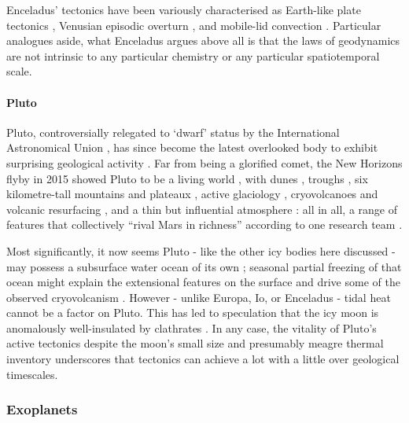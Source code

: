 \documentclass[a4paper,11pt,oneside]{book}
\begin{document}
Enceladus' tectonics have been variously characterised as Earth-like plate tectonics \cite{Kargel1983-hd}, Venusian episodic overturn \citet{Tobie2008-mf, ONeill2010-bu}, and mobile-lid convection \cite{Barr2008-ro}. Particular analogues aside, what Enceladus argues above all is that the laws of geodynamics are not intrinsic to any particular chemistry or any particular spatiotemporal scale.

\paragraph{Pluto}

Pluto, controversially relegated to `dwarf' status by the International Astronomical Union \cite{Marschall2009-pd}, has since become the latest overlooked body to exhibit surprising geological activity \cite{Hand2015-bv}. Far from being a glorified comet, the New Horizons flyby in 2015 \cite{Stern2015-fe} showed Pluto to be a living world \cite{Moore2016-jb}, with dunes \cite{Telfer2018-sy}, troughs \cite{Grundy2016-ya}, six kilometre-tall mountains and plateaux \cite{Schenk2018-jv}, active glaciology \cite{Bertrand2016-qq}, cryovolcanoes \cite{Singer2018-eh} and volcanic resurfacing \citet{Singer2017-dn, Cruikshank2019-al, Dalle_Ore2019-ke}, and a thin but influential atmosphere \cite{Gladstone2016-hn}: all in all, a range of features that collectively ``rival Mars in richness'' according to one research team \cite{Stern2018-ui}.

Most significantly, it now seems Pluto - like the other icy bodies here discussed - may possess a subsurface water ocean of its own \cite{Nimmo2016-fj}; seasonal partial freezing of that ocean might explain the extensional features on the surface \cite{Hammond2016-ha} and drive some of the observed cryovolcanism \cite{Dalle_Ore2019-ke}. However - unlike Europa, Io, or Enceladus - tidal heat cannot be a factor on Pluto. This has led to speculation that the icy moon is anomalously well-insulated by clathrates \cite{Kamata2019-yv}. In any case, the vitality of Pluto's active tectonics despite the moon's small size and presumably meagre thermal inventory underscores that tectonics can achieve a lot with a little over geological timescales.

\subsubsection{Exoplanets}
\end{document}
